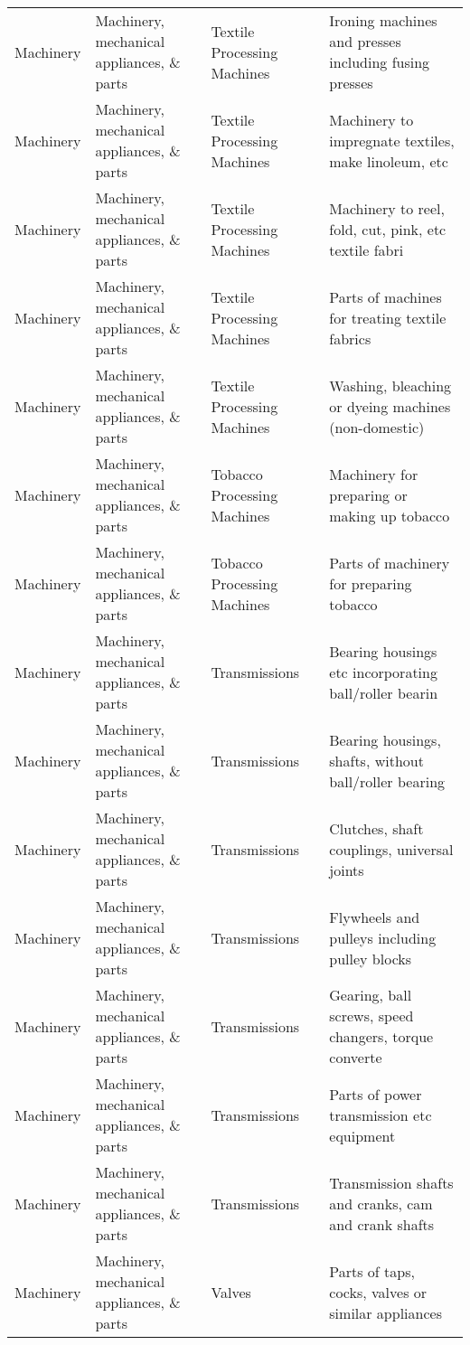 \begin{appendices}
\begin{xltabular}{\textwidth}{|p{0.07\textwidth}|p{0.25\textwidth}|p{0.28\textwidth}|p{0.3\textwidth}|}
		Machinery & Machinery, mechanical appliances, \& parts & Textile Processing Machines & Ironing machines and presses including fusing presses \\
		Machinery & Machinery, mechanical appliances, \& parts & Textile Processing Machines & Machinery to impregnate textiles, make linoleum, etc \\
		Machinery & Machinery, mechanical appliances, \& parts & Textile Processing Machines & Machinery to reel, fold, cut, pink, etc textile fabri \\
		Machinery & Machinery, mechanical appliances, \& parts & Textile Processing Machines & Parts of machines for treating textile fabrics \\
		Machinery & Machinery, mechanical appliances, \& parts & Textile Processing Machines & Washing, bleaching or dyeing machines (non-domestic) \\
		Machinery & Machinery, mechanical appliances, \& parts & Tobacco Processing Machines & Machinery for preparing or making up tobacco \\
		Machinery & Machinery, mechanical appliances, \& parts & Tobacco Processing Machines & Parts of machinery for preparing tobacco \\
		Machinery & Machinery, mechanical appliances, \& parts & Transmissions & Bearing housings etc incorporating ball/roller bearin \\
		Machinery & Machinery, mechanical appliances, \& parts & Transmissions & Bearing housings, shafts, without ball/roller bearing \\
		Machinery & Machinery, mechanical appliances, \& parts & Transmissions & Clutches, shaft couplings, universal joints \\
		Machinery & Machinery, mechanical appliances, \& parts & Transmissions & Flywheels and pulleys including pulley blocks \\
		Machinery & Machinery, mechanical appliances, \& parts & Transmissions & Gearing, ball screws, speed changers, torque converte \\
		Machinery & Machinery, mechanical appliances, \& parts & Transmissions & Parts of power transmission etc equipment \\
		Machinery & Machinery, mechanical appliances, \& parts & Transmissions & Transmission shafts and cranks, cam and crank shafts \\
		Machinery & Machinery, mechanical appliances, \& parts & Valves & Parts of taps, cocks, valves or similar appliances \\

\end{xltabular}
\end{appendices}
